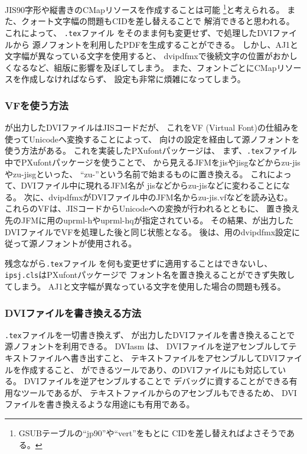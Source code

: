 JIS90字形や縦書きのCMapリソースを作成することは可能
\footnote{GSUBテーブルの``jp90''や``vert''をもとに
  CIDを差し替えればよさそうである。}と考えられる。
また、クォート文字幅の問題もCIDを差し替えることで
解消できると思われる。
これによって、
\texttt{\textcompwordmark .tex}ファイル
をそのまま何も変更せず、\pTeX で処理したDVIファイルから
源ノフォントを利用したPDFを生成することができる。
しかし、AJ1と文字幅が異なっている文字を使用すると、
dvipdfmxで後続文字の位置がおかしくなるなど、組版に影響を及ぼしてしまう。
また、フォントごとにCMapリソースを作成しなければならず、
設定も非常に煩雑になってしまう。

\subsubsection{VFを使う方法}

\pTeX が出力したDVIファイルはJISコードだが、
これをVF (Virtual Font)の仕組みを使ってUnicodeへ変換することによって、
\upTeX 向けの設定を経由して源ノフォントを使う方法がある。
これを実装したPXufontパッケージ\cite{pxufont}は、
まず、\texttt{\textcompwordmark .tex}ファイル
中でPXufontパッケージを使うことで、
\pTeX から見えるJFMをjisやjisgなどからzu-jisやzu-jisgといった、
``zu-''という名前で始まるものに置き換える。
これによって、DVIファイル中に現れるJFM名が
jisなどからzu-jisなどに変わることになる。
次に、dvipdfmxがDVIファイル中のJFM名からzu-jis.vfなどを読み込む。
これらのVFは、JISコードからUnicodeへの変換が行われるとともに、
置き換え先のJFMに\upTeX 用のuprml-hやuprml-hqが指定されている。
その結果、\upTeX が出力したDVIファイルでVFを処理した後と同じ状態となる。
後は、\upTeX 用のdvipdfmx設定に従って源ノフォントが使用される。

残念ながら\texttt{\textcompwordmark .tex}ファイル
を何も変更せずに適用することはできないし、
\texttt{ipsj.cls}はPXufontパッケージで
フォント名を置き換えることができず失敗\cite{pxufont-ipsj-fail}してしまう。
AJ1と文字幅が異なっている文字を使用した場合の問題も残る。

\subsubsection{DVIファイルを書き換える方法}

\texttt{\textcompwordmark .tex}ファイルを一切書き換えず、
\pTeX が出力したDVIファイルを書き換えることで源ノフォントを利用できる。
DVIasm \cite{dviasm}は、
DVIファイルを逆アセンブルしてテキストファイルへ書き出すこと、
テキストファイルをアセンブルしてDVIファイルを作成すること、
ができるツールであり、\pTeX のDVIファイルにも対応している。
DVIファイルを逆アセンブルすることで
デバッグに資することができる有用なツールであるが、
テキストファイルからのアセンブルもできるため、
DVIファイルを書き換えるような用途にも有用である。

